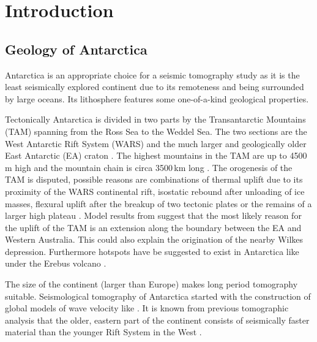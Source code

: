 

\chapter{Introduction}

\section{Geology of Antarctica}
Antarctica is an appropriate choice for a seismic tomography study as it is the least seismically explored continent 
due to its remoteness and being surrounded by large oceans. 
Its lithosphere features some one-of-a-kind geological properties. 

Tectonically Antarctica is divided in two parts by the Transantarctic Mountains (TAM) spanning from the Ross Sea to the Weddel Sea.
The two sections are the West Antarctic Rift System (WARS) and the much larger and geologically older East Antarctic (EA) craton \citep{Gupta2009}. 
The highest mountains in the TAM are up to 4500$\,$m high and the mountain chain is circa 3500$\,$km long \citep{Morelli2004}.
The orogenesis %
of the TAM is disputed, possible reasons are combinations of thermal uplift due to its proximity of the WARS continental rift, 
isostatic rebound after unloading of ice masses, flexural uplift after the breakup of two tectonic plates or 
the remains of a larger high plateau \citep{VanWijk2008}.
Model results from \citealp{VanWijk2008} suggest that the most likely reason for the uplift of the TAM is an extension along the 
boundary between the EA and Western Australia. This could also explain the origination of the nearby Wilkes depression.
Furthermore hotspots have be suggested to exist in Antarctica like under the Erebus volcano \citep{Gupta2009}.

The size of the continent (larger than Europe) makes long period tomography suitable.  
Seismological tomography of Antarctica started with the construction of global models of wave velocity like \citealp{Woodhouse1984}.
It is known from previous tomographic analysis that the older, eastern part of the continent consists of seismically faster material than 
the younger Rift System in the West \citep{Morelli2004}.

